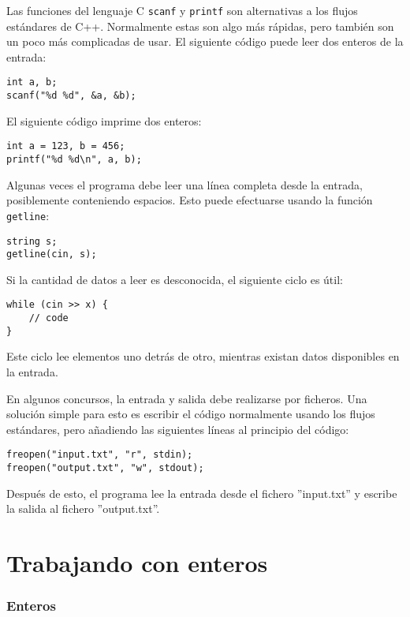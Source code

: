 Las funciones del lenguaje C \texttt{scanf}
y \texttt{printf} son alternativas a los flujos
est\'andares de C++.
Normalmente estas son algo m\'as r\'apidas,
pero tambi\'en son un poco m\'as complicadas de
usar. El siguiente c\'odigo puede leer dos
enteros de la entrada:

\begin{lstlisting}
int a, b;
scanf("%d %d", &a, &b);
\end{lstlisting}

El siguiente c\'odigo imprime dos enteros:

\begin{lstlisting}
int a = 123, b = 456;
printf("%d %d\n", a, b);
\end{lstlisting}

Algunas veces el programa debe leer una l\'inea
completa desde la entrada, posiblemente
conteniendo espacios. Esto puede efectuarse
usando la funci\'on \texttt{getline}:

\begin{lstlisting}
string s;
getline(cin, s);
\end{lstlisting}

Si la cantidad de datos a leer es desconocida, el
siguiente ciclo es \'util:

\begin{lstlisting}
while (cin >> x) {
    // code
}
\end{lstlisting}

Este ciclo lee elementos
uno detr\'as de otro, mientras existan
datos disponibles en la entrada.

En algunos concursos, la entrada y salida debe
realizarse por ficheros. Una soluci\'on simple
para esto es escribir el c\'odigo normalmente
usando los flujos est\'andares, pero a\~nadiendo
las siguientes l\'ineas al principio del c\'odigo:

\begin{lstlisting}
freopen("input.txt", "r", stdin);
freopen("output.txt", "w", stdout);
\end{lstlisting}

Despu\'es de esto, el programa lee la entrada desde el
fichero ''input.txt'' y escribe la salida al fichero
''output.txt''.

\section{Trabajando con enteros}


\subsubsection{Enteros}

